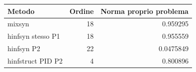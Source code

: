 \begin{center}\small\begin{tabular}{lrr}\toprule
Metodo & Ordine & Norma proprio problema\\\midrule
mixsyn & 18 & 0.959295\\
hinfsyn stesso P1 & 18 & 0.955559\\
hinfsyn P2 & 22 & 0.0475849\\
hinfstruct PID P2 & 4 & 0.800896\\
\bottomrule\end{tabular}
\end{center}
